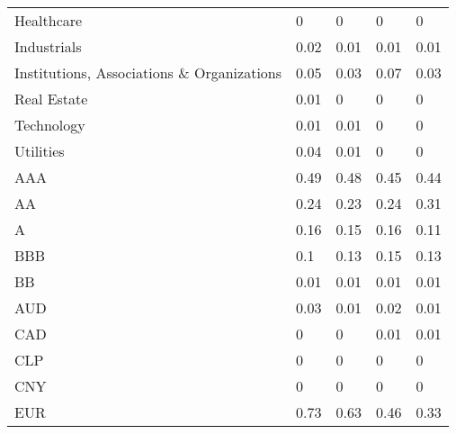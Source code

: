 \begin{table}[H]
\begin{tabular}{lllll}
Healthcare & \cellcolor[HTML]{FCFCFF}0 & \cellcolor[HTML]{FCFCFF}0 & \cellcolor[HTML]{FCFCFF}0 & \cellcolor[HTML]{FCFCFF}0 \\
Industrials & \cellcolor[HTML]{F9FBFC}0.02 & \cellcolor[HTML]{FBFCFE}0.01 & \cellcolor[HTML]{FBFCFE}0.01 & \cellcolor[HTML]{FBFCFE}0.01 \\
Institutions,   Associations \& Organizations & \cellcolor[HTML]{F3F9F8}0.05 & \cellcolor[HTML]{F7FAFB}0.03 & \cellcolor[HTML]{F0F7F5}0.07 & \cellcolor[HTML]{F7FAFB}0.03 \\
Real Estate & \cellcolor[HTML]{FBFCFE}0.01 & \cellcolor[HTML]{FCFCFF}0 & \cellcolor[HTML]{FCFCFF}0 & \cellcolor[HTML]{FCFCFF}0 \\
Technology & \cellcolor[HTML]{FBFCFE}0.01 & \cellcolor[HTML]{FBFCFE}0.01 & \cellcolor[HTML]{FCFCFF}0 & \cellcolor[HTML]{FCFCFF}0 \\
Utilities & \cellcolor[HTML]{F5FAF9}0.04 & \cellcolor[HTML]{FBFCFE}0.01 & \cellcolor[HTML]{FCFCFF}0 & \cellcolor[HTML]{FCFCFF}0 \\
AAA & \cellcolor[HTML]{A4D9B3}0.49 & \cellcolor[HTML]{A6D9B5}0.48 & \cellcolor[HTML]{ABDCBA}0.45 & \cellcolor[HTML]{ADDCBB}0.44 \\
AA & \cellcolor[HTML]{D1EBDA}0.24 & \cellcolor[HTML]{D3ECDC}0.23 & \cellcolor[HTML]{D1EBDA}0.24 & \cellcolor[HTML]{C5E6CF}0.31 \\
A & \cellcolor[HTML]{E0F1E7}0.16 & \cellcolor[HTML]{E1F2E8}0.15 & \cellcolor[HTML]{E0F1E7}0.16 & \cellcolor[HTML]{E9F4EE}0.11 \\
BBB & \cellcolor[HTML]{EAF5F0}0.1 & \cellcolor[HTML]{E5F3EB}0.13 & \cellcolor[HTML]{E1F2E8}0.15 & \cellcolor[HTML]{E5F3EB}0.13 \\
BB & \cellcolor[HTML]{FBFCFE}0.01 & \cellcolor[HTML]{FBFCFE}0.01 & \cellcolor[HTML]{FBFCFE}0.01 & \cellcolor[HTML]{FBFCFE}0.01 \\
AUD & \cellcolor[HTML]{F7FAFB}0.03 & \cellcolor[HTML]{FBFCFE}0.01 & \cellcolor[HTML]{F9FBFC}0.02 & \cellcolor[HTML]{FBFCFE}0.01 \\
CAD & \cellcolor[HTML]{FCFCFF}0 & \cellcolor[HTML]{FCFCFF}0 & \cellcolor[HTML]{FBFCFE}0.01 & \cellcolor[HTML]{FBFCFE}0.01 \\
CLP & \cellcolor[HTML]{FCFCFF}0 & \cellcolor[HTML]{FCFCFF}0 & \cellcolor[HTML]{FCFCFF}0 & \cellcolor[HTML]{FCFCFF}0 \\
CNY & \cellcolor[HTML]{FCFCFF}0 & \cellcolor[HTML]{FCFCFF}0 & \cellcolor[HTML]{FCFCFF}0 & \cellcolor[HTML]{FCFCFF}0 \\
EUR & \cellcolor[HTML]{79C78E}0.73 & \cellcolor[HTML]{8BCF9E}0.63 & \cellcolor[HTML]{AADBB8}0.46 & \cellcolor[HTML]{C1E4CC}0.33 \\

\end{tabular}
\end{table}
